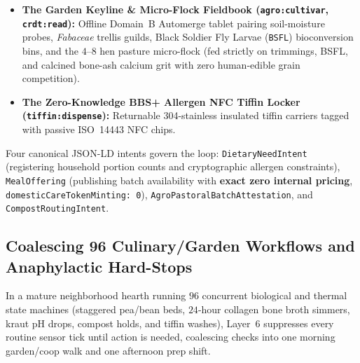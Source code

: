 \begin{itemize}
    \item \textbf{The Garden Keyline \& Micro-Flock Fieldbook (\texttt{agro:cultivar}, \texttt{crdt:read}):} Offline Domain~B Automerge tablet pairing soil-moisture probes, \textit{Fabaceae} trellis guilds, Black Soldier Fly Larvae (\texttt{BSFL}) bioconversion bins, and the $4\text{--}8$ hen pasture micro-flock (fed strictly on trimmings, BSFL, and calcined bone-ash calcium grit with zero human-edible grain competition).
    \item \textbf{The Zero-Knowledge BBS+ Allergen NFC Tiffin Locker (\texttt{tiffin:dispense}):} Returnable 304-stainless insulated tiffin carriers tagged with passive ISO~14443 NFC chips.
\end{itemize}

Four canonical JSON-LD intents govern the loop: \texttt{DietaryNeedIntent} (registering household portion counts and cryptographic allergen constraints), \texttt{MealOffering} (publishing batch availability with \textbf{exact zero internal pricing}, \texttt{domesticCareTokenMinting: 0}), \texttt{AgroPastoralBatchAttestation}, and \texttt{CompostRoutingIntent}.

\subsection{Coalescing 96 Culinary/Garden Workflows and Anaphylactic Hard-Stops}

In a mature neighborhood hearth running $96$ concurrent biological and thermal state machines (staggered pea/bean beds, $24$-hour collagen bone broth simmers, kraut pH drops, compost holds, and tiffin washes), Layer~6 suppresses every routine sensor tick until action is needed, coalescing checks into one morning garden/coop walk and one afternoon prep shift.

